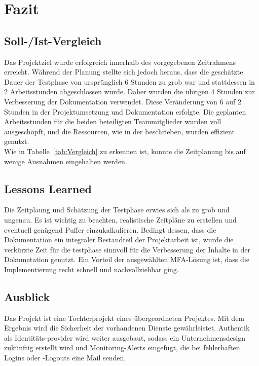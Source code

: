 \section{Fazit} 
\label{sec:Fazit}

\subsection{Soll-/Ist-Vergleich}
\label{sec:SollIstVergleich}
Das Projektziel wurde erfolgreich innerhalb des vorgegebenen Zeitrahmens erreicht. Während der Planung stellte sich jedoch heraus, dass die 
geschätzte Dauer der Testphase von ursprünglich 6 Stunden zu grob war und stattdessen in 2 Arbeitsstunden abgeschlossen wurde. Daher wurden die 
übrigen 4 Stunden zur Verbesserung der Dokumentation verwendet. Diese Veränderung von 6 auf 2 Stunden in der Projektumsetzung und Dokumentation 
erfolgte. Die geplanten Arbeitsstunden für die beiden beteiligten Teammitglieder wurden voll ausgeschöpft, und die Ressourcen, wie in der 
 beschrieben, wurden effizient genutzt.
\\Wie in Tabelle~\ref{tab:Vergleich}  zu erkennen ist, konnte die Zeitplanung bis auf wenige Ausnahmen eingehalten werden.

\subsection{Lessons Learned}
\label{sec:LessonsLearned}
Die Zeitplaung und Schätzung der Testphase erwies sich als zu grob und ungenau. Es ist wichtig zu beachten, realistische Zeitpläne zu erstellen 
und eventuell genügend Puffer einzukalkulieren. Bedingt dessen, dass die Dokumentation ein integraler Bestandteil der Projektarbeit ist, 
wurde die verkürzte Zeit für die testphase sinnvoll für die Verbesserung der Inhalte in der Dokumetation genutzt. Ein Vorteil der 
ausgewählten \acs*{MFA}-Lösung ist, dass die Implementierung recht schnell und nachvollziehbar ging.

\subsection{Ausblick}
\label{sec:Ausblick}
Das Projekt ist eine Tochterprojekt eines übergeordneten Projektes. Mit dem Ergebnis wird die Sicherheit der vorhandenen Dienste gewährleistet. 
Authentik als Identitäts-provider wird weiter ausgebaut, sodass ein Unternehmensdesign zukünftig erstellt wird und Monitoring-Alerts eingefügt, 
die bei fehlerhaften Logins oder -Logouts eine Mail senden.
